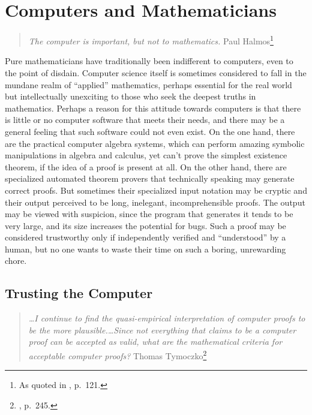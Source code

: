 \section{Computers and Mathematicians}

\begin{quote}
  {\em The computer is important, but not to mathematics.}
    \flushright\sc  Paul Halmos\footnote{As quoted in \cite{Albers}, p.~121.}\\
\end{quote}

Pure mathematicians have traditionally been indifferent to computers, even to
the point of disdain.  Computer science
itself is sometimes considered to fall in the mundane realm of ``applied''
mathematics, perhaps essential for the real world but intellectually unexciting
to those who seek the deepest truths in mathematics.  Perhaps a reason for this
attitude towards computers is that there is little or no computer software that
meets their needs, and there may be a general feeling that such software could
not even exist.  On the one hand, there are the practical computer algebra
systems, which can perform amazing symbolic manipulations in algebra and
calculus, yet can't prove the simplest
existence theorem, if the idea of a proof is present at all.  On the other
hand, there are specialized automated theorem provers that technically speaking
may generate correct proofs.  But sometimes
their specialized input notation may be cryptic and their output perceived to
be long, inelegant, incomprehensible proofs.    The output
may be viewed with suspicion, since the program that generates it tends to be
very large, and its size increases the potential for bugs.  Such a proof may be considered trustworthy only if
independently verified and ``understood'' by a human, but no one wants to
waste their time on such a boring, unrewarding chore.



\subsection{Trusting the Computer}

\begin{quote}
  {\em \ldots I continue to find the quasi-empirical interpretation of
  computer proofs to be the more plausible.\ldots Since not
  everything that claims to be a computer proof can be
  accepted as valid, what are the mathematical criteria for acceptable
  computer proofs?}
    \flushright\sc  Thomas Tymoczko\footnote{\cite{Tymoczko}, p.~245.}\\
\end{quote}

